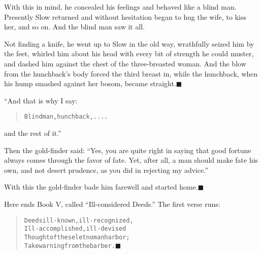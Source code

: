 \documentclass[article, twoside, 14pt]{memoir}
\newcommand{\qed}{\hfill \ensuremath{\blacksquare}}
\renewenvironment{verbatim}{%
\begin{quote}%
\vskip -10pt%
\begin{alltt}\normalfont\large}{\end{alltt}%
\end{quote}%
\vskip -10pt
} %
\begin{document}
With this in mind, he concealed his feelings and behaved like a
blind man. Presently Slow returned and without hesitation began to
hug the wife, to kiss her, and so on. And the blind man saw it all.


Not finding a knife, he went up to Slow in the old way, wrathfully
seized him by the feet, whirled him about his head with every bit
of strength he could muster, and dashed him against the chest of
the three-breasted woman. And the blow from the hunchback's body
forced the third breast in, while the hunchback, when his hump
smashed against her bosom, became straight.\hyperref[s89]{\qed}

“And that is why I say:

\begin{verbatim}
Blind man, hunchback, . . . .
\end{verbatim}
and the rest of it.”

Then the gold-finder said:
``Yes, you are quite right in saying that good fortune always comes through the favor of fate. Yet, after all, a man should make fate his own, and not desert prudence, as you did in rejecting my advice.''

With this the gold-finder bade him farewell and started
home.\hyperref[s81]{\qed}

Here ends Book V, called ``Ill-considered Deeds.'' The first verse
runs:

\begin{verbatim}
Deeds ill-known, ill-recognized,
Ill-accomplished, ill-devised{\textemdash}
Thought of these let no man harbor;
Take warning from the barber.\hyperref[s80]{\qed}
\end{verbatim}
\end{document}
